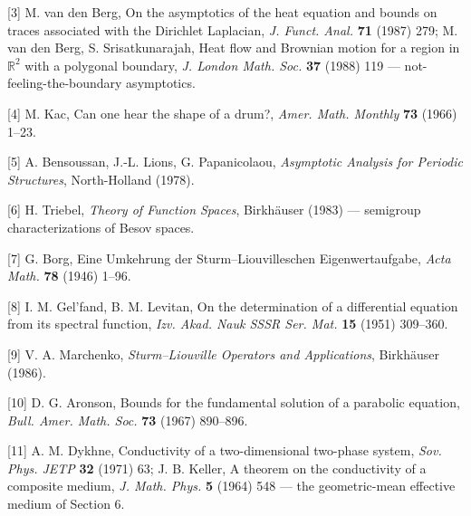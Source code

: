 \documentclass[11pt]{article}
\begin{document}
[3] M. van den Berg, On the asymptotics of the heat equation and bounds on traces associated with the Dirichlet Laplacian, \emph{J. Funct. Anal.} \textbf{71} (1987) 279; M. van den Berg, S. Srisatkunarajah, Heat flow and Brownian motion for a region in $\mathbb R^2$ with a polygonal boundary, \emph{J. London Math. Soc.} \textbf{37} (1988) 119 — not-feeling-the-boundary asymptotics.

[4] M. Kac, Can one hear the shape of a drum?, \emph{Amer. Math. Monthly} \textbf{73} (1966) 1–23.

[5] A. Bensoussan, J.-L. Lions, G. Papanicolaou, \emph{Asymptotic Analysis for Periodic Structures}, North-Holland (1978).

[6] H. Triebel, \emph{Theory of Function Spaces}, Birkhäuser (1983) — semigroup characterizations of Besov spaces.

[7] G. Borg, Eine Umkehrung der Sturm–Liouvilleschen Eigenwertaufgabe, \emph{Acta Math.} \textbf{78} (1946) 1–96.

[8] I. M. Gel'fand, B. M. Levitan, On the determination of a differential equation from its spectral function, \emph{Izv. Akad. Nauk SSSR Ser. Mat.} \textbf{15} (1951) 309–360.

[9] V. A. Marchenko, \emph{Sturm–Liouville Operators and Applications}, Birkhäuser (1986).

[10] D. G. Aronson, Bounds for the fundamental solution of a parabolic equation, \emph{Bull. Amer. Math. Soc.} \textbf{73} (1967) 890–896.

[11] A. M. Dykhne, Conductivity of a two-dimensional two-phase system, \emph{Sov. Phys. JETP} \textbf{32} (1971) 63; J. B. Keller, A theorem on the conductivity of a composite medium, \emph{J. Math. Phys.} \textbf{5} (1964) 548 — the geometric-mean effective medium of Section 6.
\end{document}
